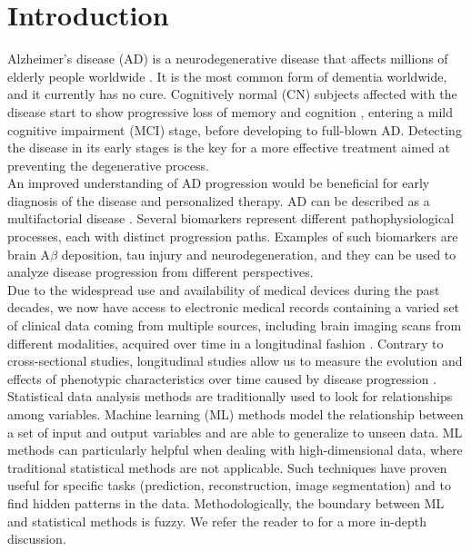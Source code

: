 \section{Introduction}

Alzheimer's disease (AD) is a neurodegenerative disease that affects millions of elderly people worldwide \cite{Ferri2005,Prince2013}. It is the most common form of dementia worldwide, and it currently has no cure. Cognitively normal (CN) subjects affected with the disease start to show progressive loss of memory and cognition \cite{Backman2004}, entering a mild cognitive impairment (MCI) stage, before developing to full-blown AD. Detecting the disease in its early stages is the key for a more effective treatment aimed at preventing the degenerative process.  \\

An improved understanding of AD progression would be beneficial for early diagnosis of the disease and personalized therapy. AD can be described as a multifactorial disease \cite{Jack2010}. Several biomarkers represent different pathophysiological processes, each with distinct progression paths. Examples of such biomarkers are brain A$\beta$ deposition, tau injury and neurodegeneration, and they can be used to analyze disease progression from different perspectives. \\ 

Due to the widespread use and availability of medical devices during the past decades, we now have access to electronic medical records containing a varied set of clinical data coming from multiple sources, including brain imaging scans from different modalities, acquired over time in a longitudinal fashion \cite{Lawrence2017}.  Contrary to cross-sectional studies, longitudinal studies allow us to measure the evolution and effects of phenotypic characteristics over time caused by disease progression \cite{Mills2014}. \\

Statistical data analysis methods are traditionally used to look for relationships among variables. Machine learning (ML) methods model the relationship between a set of input and output variables and are able to generalize to unseen data. ML methods can particularly helpful when dealing with high-dimensional data, where traditional statistical methods are not applicable. Such techniques have proven useful for specific tasks (prediction, reconstruction, image segmentation) and to find hidden patterns in the data. Methodologically, the boundary between ML and statistical methods is fuzzy. We refer the reader to \cite{Breiman2001,Shmueli2010} for a more in-depth discussion. \\

